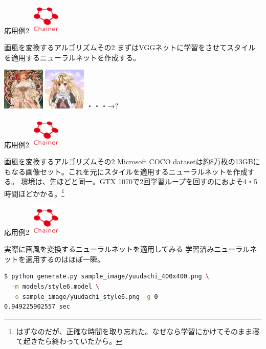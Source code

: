 \documentclass[12pt, unicode]{beamer}
\begin{document}
\begin{frame}[fragile]{応用例2}
\includegraphics[clip,width=1.5cm]{image/chainer_logo.png}
\begin{block}{画風を変換するアルゴリズムその2}
まずはVGGネットに学習をさせてスタイルを適用するニューラルネットを作成する。
\end{block}
\includegraphics[clip,width=2.0cm]{image/style_6.png}
\includegraphics[clip,width=2.0cm]{image/yuudachi_400x400.png}
・・・→\Large{?}
\end{frame}

\begin{frame}[fragile]{応用例2}
\includegraphics[clip,width=1.5cm]{image/chainer_logo.png}
\begin{block}{画風を変換するアルゴリズムその2}
Microsoft COCO datasetは約8万枚の13GBにもなる画像セット。これを元にスタイルを適用するニューラルネットを作成する。
環境は、先ほどと同一。GTX 1070で2回学習ループを回すのにおよそ4・5時間ほどかかる。\footnote[frame]{はずなのだが、正確な時間を取り忘れた。なぜなら学習にかけてそのまま寝て起きたら終わっていたから。}
\end{block}
\end{frame}

\begin{frame}[fragile]{応用例2}
\includegraphics[clip,width=1.5cm]{image/chainer_logo.png}
\begin{block}{実際に画風を変換するニューラルネットを適用してみる}
学習済みニューラルネットを適用するのはほぼ一瞬。
\end{block}
\begin{lstlisting}[language=bash,basicstyle=\ttfamily\Small,caption={apply trained neural net}]
$ python generate.py sample_image/yuudachi_400x400.png \
  -m models/style6.model \
  -o sample_image/yuudachi_style6.png -g 0
0.949225902557 sec
\end{lstlisting}
\end{frame}
\end{document}
